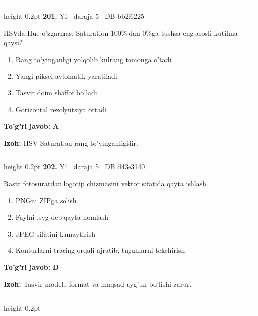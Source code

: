 \documentclass[10pt,a4paper,oneside]{article}
\begin{document}
\vspace{2mm}\hrule height 0.2pt \vspace{4mm}
\hypertarget{q201}{\textbf{\color{ink}201.}}  {\color{muted}\scriptsize Y1 \textbullet\ daraja 5 \textbullet\ DB bb2f6225}
\par
HSVda Hue o'zgarmas, Saturation 100\% dan 0\%ga tushsa eng asosli kutilma qaysi?
\begin{enumerate}[label=\Alph*),leftmargin=9mm]
\item Rang to'yinganligi yo'qolib kulrang tomonga o'tadi
\item Yangi piksel avtomatik yaratiladi
\item Tasvir doim shaffof bo'ladi
\item Gorizontal rezolyutsiya ortadi
\end{enumerate}
\begin{tcolorbox}[enhanced,breakable,colback=teal!4,colframe=teal!45!black,boxrule=0.45pt,arc=1.2mm,left=2.8mm,right=2.8mm,top=2mm,bottom=2mm,before skip=2mm,after skip=2mm]
\textbf{\color{teal}To'g'ri javob:} \textbf{A}
\par\smallskip
\textbf{Izoh:} HSV Saturation rang to'yinganligidir.
\end{tcolorbox}
\vspace{2mm}\hrule height 0.2pt \vspace{4mm}
\hypertarget{q202}{\textbf{\color{ink}202.}}  {\color{muted}\scriptsize Y1 \textbullet\ daraja 5 \textbullet\ DB d43e3140}
\par
Rastr fotosuratdan logotip chizmasini vektor sifatida qayta ishlash
\begin{enumerate}[label=\Alph*),leftmargin=9mm]
\item PNGni ZIPga solish
\item Faylni .svg deb qayta nomlash
\item JPEG sifatini kamaytirish
\item Konturlarni tracing orqali ajratib, tugunlarni tekshirish
\end{enumerate}
\begin{tcolorbox}[enhanced,breakable,colback=teal!4,colframe=teal!45!black,boxrule=0.45pt,arc=1.2mm,left=2.8mm,right=2.8mm,top=2mm,bottom=2mm,before skip=2mm,after skip=2mm]
\textbf{\color{teal}To'g'ri javob:} \textbf{D}
\par\smallskip
\textbf{Izoh:} Tasvir modeli, format va maqsad uyg'un bo'lishi zarur.
\end{tcolorbox}
\vspace{2mm}\hrule height 0.2pt \vspace{4mm}
\end{document}
